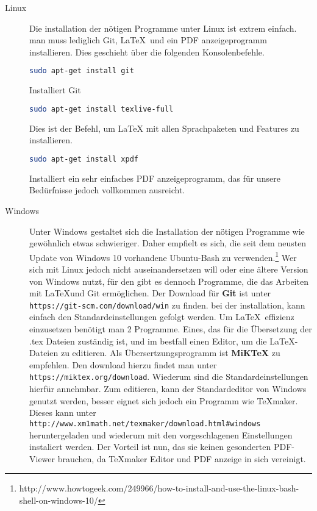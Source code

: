 \documentclass[12pt,a4paper]{scrartcl}
\begin{document}
\begin{description}
\item[Linux]
Die installation der nötigen Programme unter Linux ist extrem einfach. man muss lediglich Git, \LaTeX \ und ein PDF anzeigeprogramm installieren. Dies geschieht über die folgenden Konsolenbefehle.
\begin{lstlisting}[language=bash]
sudo apt-get install git
\end{lstlisting}
Installiert Git
\begin{lstlisting}[language=bash]
sudo apt-get install texlive-full 
\end{lstlisting}
Dies ist der Befehl, um LaTeX mit allen Sprachpaketen und Features zu installieren.
\begin{lstlisting}[language=bash]
sudo apt-get install xpdf
\end{lstlisting}
Installiert ein sehr einfaches PDF anzeigeprogramm, das für unsere Bedürfnisse jedoch vollkommen ausreicht.


\item[Windows]

Unter Windows gestaltet sich die Installation der nötigen Programme wie gewöhnlich etwas schwieriger. Daher empfielt es sich, die seit dem neusten Update von Windows 10 vorhandene Ubuntu-Bash zu verwenden.\footnote{http://www.howtogeek.com/249966/how-to-install-and-use-the-linux-bash-shell-on-windows-10/} Wer sich mit Linux jedoch nicht auseinandersetzen will oder eine ältere Version von Windows nutzt, für den gibt es dennoch Programme, die das Arbeiten mit \LaTeX und Git ermöglichen. Der Download für \textbf{Git} ist unter \verb+https://git-scm.com/download/win+ zu finden. bei der installation, kann einfach den Standardeinstellungen gefolgt werden. Um \LaTeX \ effizienz einzusetzen benötigt man 2 Programme. Eines, das für die Übersetzung der .tex Dateien zuständig ist, und im bestfall einen Editor, um die \LaTeX -Dateien zu editieren. Als Übersertzungsprogramm ist \textbf{MiKTeX} zu empfehlen. Den download hierzu findet man unter \verb+https://miktex.org/download+. Wiederum sind die Standardeinstellungen hierfür annehmbar. Zum editieren, kann der Standardeditor von Windows genutzt werden, besser eignet sich jedoch ein Programm wie TeXmaker. Dieses kann unter \verb+http://www.xm1math.net/texmaker/download.html#windows+ heruntergeladen und wiederum mit den vorgeschlagenen Einstellungen instaliert werden. Der Vorteil ist nun, das sie keinen gesonderten PDF-Viewer brauchen, da TeXmaker Editor und PDF anzeige in sich vereinigt.
\end{description}
\end{document}
